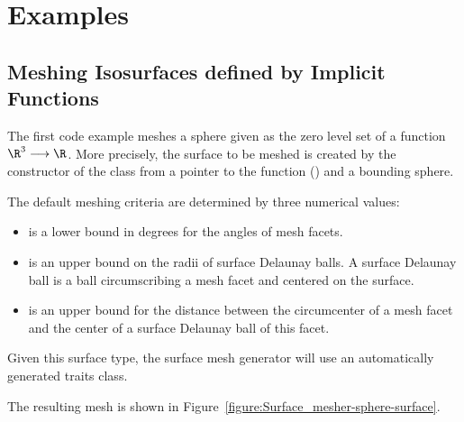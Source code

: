 
\def\ccLongParamLayout{\ccFalse}

\section{Examples}
\label{SurfaceMesher_section_example}


\subsection{Meshing Isosurfaces defined by Implicit Functions}

The first code example meshes a sphere
given as the zero level set of a function $\R^3 \longrightarrow \R$.
More precisely,
the surface to be meshed is created
by the constructor
of the class 
from a pointer to the function ()
and a bounding sphere.

The default meshing criteria are determined  by three numerical
values:
\begin{itemize}
\item {} is a lower bound in degrees for the angles
     of mesh facets.
\item {} is an upper bound on the radii of surface Delaunay
balls. A surface Delaunay ball is a ball circumscribing a mesh facet
and centered on the surface.
\item {} is an upper bound for the distance
between the circumcenter of a mesh facet and the center of a surface
Delaunay ball of this facet.
\end{itemize}

Given this surface type, the surface mesh generator will use
an automatically generated traits class.

The resulting mesh is shown in
Figure~\ref{figure:Surface_mesher-sphere-surface}.

